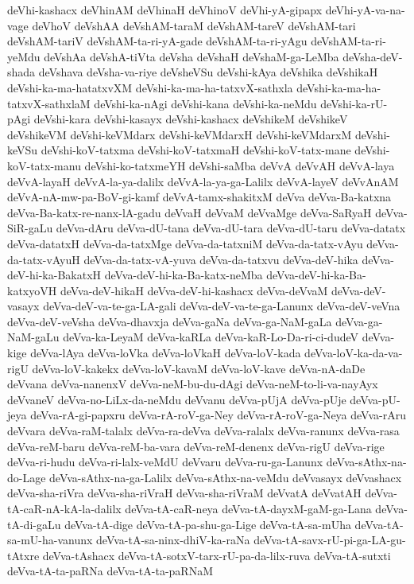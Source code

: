 {deVhi-kashacx
deVhinAM
deVhinaH
deVhinoV
deVhi-yA-gipapx
deVhi-yA-va-na-vage
deVhoV
deVshAA
deVshAM-taraM
deVshAM-tareV
deVshAM-tari
deVshAM-tariV
deVshAM-ta-ri-yA-gade
deVshAM-ta-ri-yAgu
deVshAM-ta-ri-yeMdu
deVshAa
deVshA-tiVta
deVsha
deVshaH
deVshaM-ga-LeMba
deVsha-deV-shada
deVshava
deVsha-va-riye
deVsheVSu
deVshi-kAya
deVshika
deVshikaH
deVshi-ka-ma-hatatxvXM
deVshi-ka-ma-ha-tatxvX-sathxla
deVshi-ka-ma-ha-tatxvX-sathxlaM
deVshi-ka-nAgi
deVshi-kana
deVshi-ka-neMdu
deVshi-ka-rU-pAgi
deVshi-kara
deVshi-kasayx
deVshi-kashacx
deVshikeM
deVshikeV
deVshikeVM
deVshi-keVMdarx
deVshi-keVMdarxH
deVshi-keVMdarxM
deVshi-keVSu
deVshi-koV-tatxma
deVshi-koV-tatxmaH
deVshi-koV-tatx-mane
deVshi-koV-tatx-manu
deVshi-ko-tatxmeYH
deVshi-saMba
deVvA
deVvAH
deVvA-laya
deVvA-layaH
deVvA-la-ya-dalilx
deVvA-la-ya-ga-Lalilx
deVvA-layeV
deVvAnAM
deVvA-nA-mw-pa-BoV-gi-kamf
deVvA-tamx-shakitxM
deVva
deVva-Ba-katxna
deVva-Ba-katx-re-nanx-lA-gadu
deVvaH
deVvaM
deVvaMge
deVva-SaRyaH
deVva-SiR-gaLu
deVva-dAru
deVva-dU-tana
deVva-dU-tara
deVva-dU-taru
deVva-datatx
deVva-datatxH
deVva-da-tatxMge
deVva-da-tatxniM
deVva-da-tatx-vAyu
deVva-da-tatx-vAyuH
deVva-da-tatx-vA-yuva
deVva-da-tatxvu
deVva-deV-hika
deVva-deV-hi-ka-BakatxH
deVva-deV-hi-ka-Ba-katx-neMba
deVva-deV-hi-ka-Ba-katxyoVH
deVva-deV-hikaH
deVva-deV-hi-kashacx
deVva-deVvaM
deVva-deV-vasayx
deVva-deV-va-te-ga-LA-gali
deVva-deV-va-te-ga-Lanunx
deVva-deV-veVna
deVva-deV-veVsha
deVva-dhavxja
deVva-gaNa
deVva-ga-NaM-gaLa
deVva-ga-NaM-gaLu
deVva-ka-LeyaM
deVva-kaRLa
deVva-kaR-Lo-Da-ri-ci-dudeV
deVva-kige
deVva-lAya
deVva-loVka
deVva-loVkaH
deVva-loV-kada
deVva-loV-ka-da-va-rigU
deVva-loV-kakekx
deVva-loV-kavaM
deVva-loV-kave
deVva-nA-daDe
deVvana
deVva-nanenxV
deVva-neM-bu-du-dAgi
deVva-neM-to-li-va-nayAyx
deVvaneV
deVva-no-LiLx-da-neMdu
deVvanu
deVva-pUjA
deVva-pUje
deVva-pU-jeya
deVva-rA-gi-papxru
deVva-rA-roV-ga-Ney
deVva-rA-roV-ga-Neya
deVva-rAru
deVvara
deVva-raM-talalx
deVva-ra-deVva
deVva-ralalx
deVva-ranunx
deVva-rasa
deVva-reM-baru
deVva-reM-ba-vara
deVva-reM-denenx
deVva-rigU
deVva-rige
deVva-ri-hudu
deVva-ri-lalx-veMdU
deVvaru
deVva-ru-ga-Lanunx
deVva-sAthx-na-do-Lage
deVva-sAthx-na-ga-Lalilx
deVva-sAthx-na-veMdu
deVvasayx
deVvashacx
deVva-sha-riVra
deVva-sha-riVraH
deVva-sha-riVraM
deVvatA
deVvatAH
deVva-tA-caR-nA-kA-la-dalilx
deVva-tA-caR-neya
deVva-tA-dayxM-gaM-ga-Lana
deVva-tA-di-gaLu
deVva-tA-dige
deVva-tA-pa-shu-ga-Lige
deVva-tA-sa-mUha
deVva-tA-sa-mU-ha-vanunx
deVva-tA-sa-ninx-dhiV-ka-raNa
deVva-tA-savx-rU-pi-ga-LA-gu-tAtxre
deVva-tAshacx
deVva-tA-sotxV-tarx-rU-pa-da-lilx-ruva
deVva-tA-sutxti
deVva-tA-ta-paRNa
deVva-tA-ta-paRNaM
}
